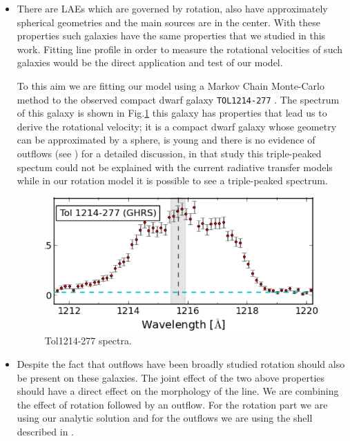 \begin{itemize}


\item There are LAEs which are governed by rotation, also 
have approximately spherical geometries and the main \ly sources are in the center. 
With these properties such galaxies have the same properties 
that we studied in this work.  
Fitting \ly line profile in order  to measure the rotational 
velocities of such galaxies would be the direct application 
and test of our model. 

To this aim we are fitting our model using a Markov Chain Monte-Carlo 
method to the observed compact dwarf galaxy \verb+TOL1214-277+\citep{Thuan97, Verhamme15}
. The spectrum of this galaxy is shown in Fig.\ref{fig:tol} 
this galaxy has properties that lead us to derive the rotational 
velocity; it is a compact dwarf galaxy whose geometry can be approximated by a sphere, 
is young and there is no evidence of outflows (see \citep{Verhamme15}) for a detailed
discussion, in that study this triple-peaked spectum could not be explained
with the current radiative transfer models while in our rotation 
model it is possible to see a triple-peaked spectrum. 

\begin{figure} 
\begin{center}
\includegraphics[scale=0.6]{Figures/tol.png}
\end{center}\caption{Tol1214-277 spectra.\label{fig:tol}} 
\end{figure}

\item Despite the fact that outflows have been broadly studied rotation should 
also be present on these galaxies. The joint effect of the two above properties 
should have a direct effect on the morphology of the \lya line. We are 
 combining the effect of rotation followed by an outflow. For the rotation
part we are using our analytic solution and for the outflows
we are using the shell described in \citep{Verhamme12}. 
\end{itemize}
